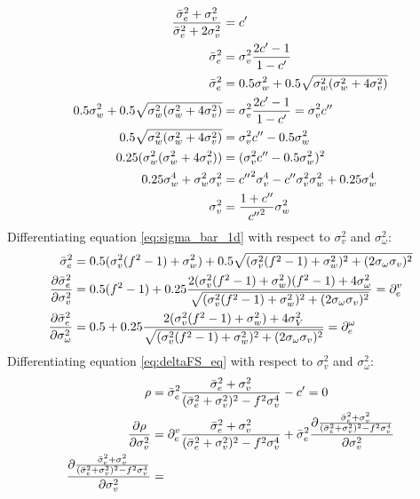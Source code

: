 \documentclass[oneside,12pt]{article}
\begin{document}
\begin{equation}
    \begin{split}
        \frac{\Bar{\sigma}_e^2 + \sigma_v^2}{\Bar{\sigma}_e^2 + 2\sigma_v^2} &= c'\\
        \Bar{\sigma}_e^2 &= \sigma_v^2\frac{2c'-1}{1-c'}\\
        \Bar{\sigma}_e^2 &= 0.5\sigma_w^2 + 0.5\sqrt{\sigma_w^2(\sigma_w^2 + 4\sigma_v^2)}\\
        0.5\sigma_w^2 + 0.5\sqrt{\sigma_w^2(\sigma_w^2 + 4\sigma_v^2)} &= \sigma_v^2\frac{2c'-1}{1-c'} = \sigma_v^2 c''\\
        0.5\sqrt{\sigma_w^2(\sigma_w^2 + 4\sigma_v^2)} &= \sigma_v^2c'' - 0.5\sigma_w^2\\
        0.25(\sigma_w^2(\sigma_w^2 + 4\sigma_v^2)) &= (\sigma_v^2c'' - 0.5\sigma_w^2)^2\\
        0.25\sigma_w^4 + \sigma_w^2\sigma_v^2 &= {c''}^2\sigma_v^4 - c''\sigma_v^2\sigma_w^2 + 0.25\sigma_w^4\\
        \sigma_v^2 &= \frac{1+c''}{{c''}^2}\sigma_w^2\\
    \end{split}
\end{equation}
%
Differentiating equation \ref{eq:sigma_bar_1d} with respect to $\sigma_v^2$ and $\sigma_\omega^2$:
%
\begin{equation}
    \begin{split}
        \Bar{\sigma}_e^2 &= 0.5(\sigma_v^2(f^2-1) + \sigma_w^2) + 0.5\sqrt{(\sigma_v^2(f^2-1) + \sigma_w^2)^2 + (2\sigma_\omega\sigma_v)^2}\\
        \frac{\partial \Bar{\sigma}_e^2}{\partial \sigma_v^2} &= 0.5(f^2-1) + 0.25\frac{2(\sigma_v^2(f^2-1) + \sigma_w^2)(f^2-1) + 4\sigma_\omega^2}{\sqrt{(\sigma_v^2(f^2-1) + \sigma_w^2)^2 + (2\sigma_\omega\sigma_v)^2}} = \partial_e^v\\
        \frac{\partial \Bar{\sigma}_e^2}{\partial \sigma_\omega^2} &= 0.5 + 0.25\frac{2(\sigma_v^2(f^2-1) + \sigma_w^2) + 4\sigma_V^2}{\sqrt{(\sigma_v^2(f^2-1) + \sigma_w^2)^2 + (2\sigma_\omega\sigma_v)^2}} = \partial_e^\omega
    \end{split}
\end{equation}
%
Differentiating equation \ref{eq:deltaFS_eq} with respect to $\sigma_v^2$ and $\sigma_\omega^2$:
%
\begin{equation}
    \begin{split}
        \rho &= \Bar{\sigma}_e^2 \frac{\Bar{\sigma}_e^2 + \sigma_v^2}{(\Bar{\sigma}_e^2 + \sigma_v^2)^2 - f^2 \sigma_v^4} -c' = 0\\
        \frac{\partial \rho}{\partial \sigma_v^2} &= \partial_e^v \frac{\Bar{\sigma}_e^2 + \sigma_v^2}{(\Bar{\sigma}_e^2 + \sigma_v^2)^2 - f^2 \sigma_v^4} + \Bar{\sigma}_e^2 \frac{\partial \frac{\Bar{\sigma}_e^2 + \sigma_v^2}{(\Bar{\sigma}_e^2 + \sigma_v^2)^2 - f^2 \sigma_v^4}}{\partial \sigma_v^2}\\
        \frac{\partial \frac{\Bar{\sigma}_e^2 + \sigma_v^2}{(\Bar{\sigma}_e^2 + \sigma_v^2)^2 - f^2 \sigma_v^4}}{\partial \sigma_v^2} &=
    \end{split}
\end{equation}
\end{document}
